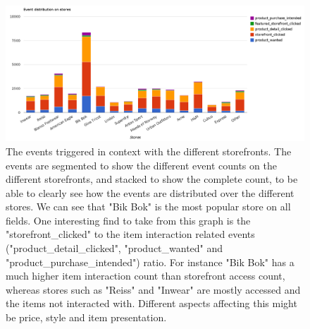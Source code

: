     \begin{figure}[H]
        \includegraphics[width=5in]{image/event_distr.png}
        \centering
        \caption[Distribution of events on storefronts]{The events triggered in context with the different storefronts.
        The events are segmented to show the different event counts on the different storefronts, and stacked to show the complete count, to be able to clearly see how the events are distributed over the different stores.
        We can see that "Bik Bok" is the most popular store on all fields.
        One interesting find to take from this graph is the "storefront\_clicked" to the item interaction related events ("product\_detail\_clicked", "product\_wanted" and "product\_purchase\_intended") ratio.
        For instance "Bik Bok" has a much higher item interaction count than storefront access count, whereas stores such as "Reiss" and "Inwear" are mostly accessed and the items not interacted with.
        Different aspects affecting this might be price, style and item presentation.}
    \end{figure}



